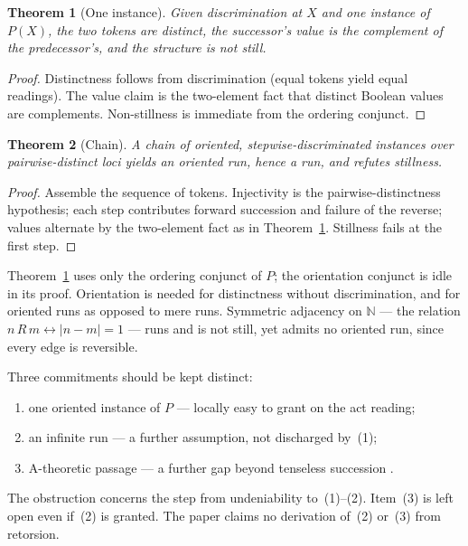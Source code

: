 \documentclass[11pt]{article}
\newtheorem{theorem}{Theorem}[section]
\begin{document}
\begin{theorem}[One instance]
\label{thm:actuality}
Given discrimination at \(X\) and one instance of \(P(X)\), the two tokens are
distinct, the successor's value is the complement of the predecessor's, and the
structure is not still.
\end{theorem}

\begin{proof}
Distinctness follows from discrimination (equal tokens yield equal readings).
The value claim is the two-element fact that distinct Boolean values are
complements. Non-stillness is immediate from the ordering conjunct.
\end{proof}

\begin{theorem}[Chain]
\label{thm:chain}
A chain of oriented, stepwise-discriminated instances over pairwise-distinct
loci yields an oriented run, hence a run, and refutes stillness.
\end{theorem}

\begin{proof}
Assemble the sequence of tokens. Injectivity is the pairwise-distinctness
hypothesis; each step contributes forward succession and failure of the
reverse; values alternate by the two-element fact as in
Theorem~\ref{thm:actuality}. Stillness fails at the first step.
\end{proof}

Theorem~\ref{thm:actuality} uses only the ordering conjunct of \(P\); the
orientation conjunct is idle in its proof. Orientation is needed for
distinctness without discrimination, and for oriented runs as opposed to mere
runs. Symmetric adjacency on \(\mathbb{N}\) --- the relation
\(n\,R\,m \leftrightarrow |n-m|=1\) --- runs and is not still, yet admits no
oriented run, since every edge is reversible.

Three commitments should be kept distinct:
\begin{enumerate}[label=(\arabic*),itemsep=1pt]
\item one oriented instance of \(P\) --- locally easy to grant on the act reading;
\item an infinite run --- a further assumption, not discharged by~(1);
\item A-theoretic passage --- a further gap beyond tenseless succession
\cite{williams1951,mctaggart1908}.
\end{enumerate}
The obstruction concerns the step from undeniability to~(1)--(2). Item~(3) is
left open even if~(2) is granted. The paper claims no derivation of~(2) or~(3)
from retorsion.
\end{document}
